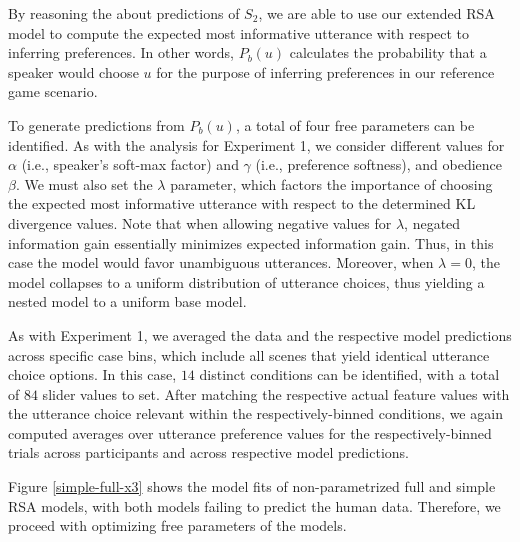 \documentclass[10pt,a4paper]{article}
\begin{document}
By reasoning the about predictions of $S_2$, we are able to use our extended RSA model to compute the expected most informative utterance with respect to inferring preferences. In other words, $P_b(u)$ calculates the probability that a speaker would choose $u$ for the purpose of inferring preferences in our reference game scenario.

To generate predictions from $P_b(u)$, a total of four free parameters can be identified. 
As with the analysis for Experiment 1, we consider different values for $\alpha$ (i.e., speaker's soft-max factor) and $\gamma$ (i.e., preference softness), and obedience $\beta$. 
We must also set the $\lambda$ parameter, which factors the importance of choosing the expected most informative utterance with respect to the determined KL divergence values.
Note that when allowing negative values for $\lambda$, negated information gain essentially minimizes expected information gain.
Thus, in this case the model would favor unambiguous utterances. 
Moreover, when $\lambda=0$, the model collapses to a uniform distribution of utterance choices, thus yielding a nested model to a uniform base model. 


As with Experiment 1, we averaged the data and the respective model predictions across specific case bins, which include all scenes that yield identical utterance choice options. 
In this case, $14$ distinct conditions can be identified, with a total of $84$ slider values to set. 
After matching the respective actual feature values with the utterance choice relevant within the respectively-binned conditions, we again computed averages over utterance preference values for the respectively-binned trials across participants and across respective model predictions. 

Figure \ref{simple-full-x3} shows the model fits of non-parametrized full and simple RSA models, with both models failing to predict the human data. Therefore, we proceed with optimizing free parameters of the models.


\end{document}
